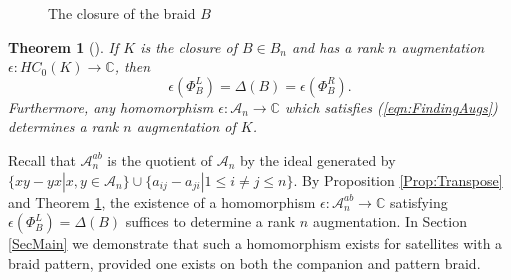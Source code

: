 \documentclass[11pt]{amsart}
\def\C{{\mathbb C}}
\def\A{{\mathcal A}}
\newtheorem{thm}{Theorem}[section]
\begin{document}
    \begin{figure}[ht]
    \caption{The closure of the braid $B$}
    \label{fig:BClosure}
    \end{figure}

  \begin{thm}[\cite{Cor13b}] If $K$ is the closure of $B\in B_n$ and has a rank $n$ augmentation $\epsilon:HC_0(K)\to\C$, then 
    \begin{equation}
    \epsilon(\Phi_B^L)=\Delta(B)=\epsilon(\Phi_B^R).
    \label{eqn:FindingAugs}
    \end{equation}
    Furthermore, any homomorphism $\epsilon:\A_n\to\C$ which satisfies (\ref{eqn:FindingAugs}) determines a rank $n$ augmentation of $K$. 
  \label{thm:RanknAugs}
  \end{thm}

  Recall that $\A_n^{ab}$ is the quotient of $\A_n$ by the ideal generated by $\{xy - yx | x,y\in \A_n\} \cup \{a_{ij}-a_{ji} | 1\le i \ne j \le n\}$. By Proposition \ref{Prop:Transpose} and Theorem \ref{thm:RanknAugs}, the existence of a homomorphism $\epsilon:\A_n^{ab}\to\C$ satisfying $\epsilon(\Phi_B^L) = \Delta(B)$ suffices to determine a rank $n$ augmentation. In Section \ref{SecMain} we demonstrate that such a homomorphism exists for satellites with a braid pattern, provided one exists on both the companion and pattern braid.
\end{document}
